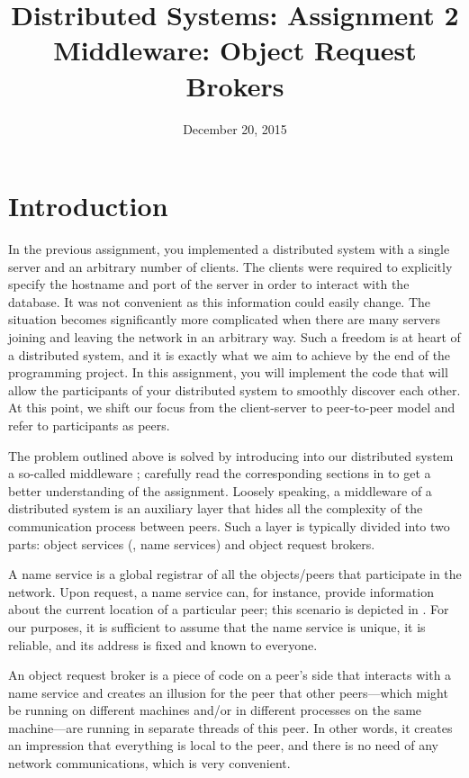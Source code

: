 \documentclass[a4paper]{article}
\title{Distributed Systems: Assignment 2\\Middleware: Object Request Brokers}
\author{}
\date{December 20, 2015}
\begin{document}
\maketitle

\section{Introduction}

In the previous assignment, you implemented a distributed system with a single
server and an arbitrary number of clients. The clients were required to
explicitly specify the hostname and port of the server in order to interact with
the database. It was not convenient as this information could easily change. The
situation becomes significantly more complicated when there are many servers
joining and leaving the network in an arbitrary way. Such a freedom is at heart
of a distributed system, and it is exactly what we aim to achieve by the end of
the programming project. In this assignment, you will implement the code that
will allow the participants of your distributed system to smoothly discover each
other. At this point, we shift our focus from the client-server to peer-to-peer
model \cite{lecture3} and refer to participants as peers.

The problem outlined above is solved by introducing into our distributed system
a so-called middleware \cite{lecture4}; carefully read the corresponding
sections in \cite{lecture4} to get a better understanding of the assignment.
Loosely speaking, a middleware of a distributed system is an auxiliary layer
that hides all the complexity of the communication process between peers. Such a
layer is typically divided into two parts: object services (\eg, name services)
and object request brokers.

A name service is a global registrar of all the objects/peers that participate
in the network. Upon request, a name service can, for instance, provide
information about the current location of a particular peer; this scenario is
depicted in . For our purposes, it is sufficient to assume
that the name service is unique, it is reliable, and its address is fixed and
known to everyone.

An object request broker \cite{lecture4, orb} is a piece of code on a peer's
side that interacts with a name service and creates an illusion for the peer
that other peers---which might be running on different machines and/or in
different processes on the same machine---are running in separate threads of
this peer. In other words, it creates an impression that everything is local to
the peer, and there is no need of any network communications, which is very
convenient.
\end{document}
